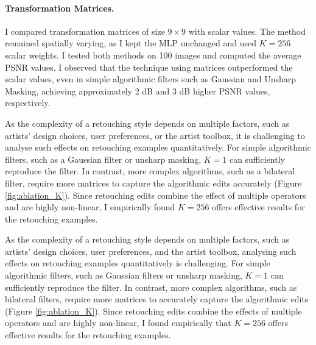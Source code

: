 \paragraph{Transformation Matrices.} I compared transformation matrices of size $9 \times 9$ with scalar values. The method remained spatially varying, as I kept the MLP unchanged and used $K=256$ scalar weights. I tested both methods on 100 images and computed the average PSNR values. I observed that the technique using matrices outperformed the scalar values, even in simple algorithmic filters such as Gaussian and Unsharp Masking, achieving approximately 2 dB and 3 dB higher PSNR values, respectively.

As the complexity of a retouching style depends on multiple factors, such as artists’ design choices, user preferences, or the artist toolbox, it is challenging to analyse such effects on retouching examples quantitatively. For simple algorithmic filters, such as a Gaussian filter or unsharp masking, $K=1$ can sufficiently reproduce the filter. In contrast, more complex algorithms, such as a bilateral filter, require more matrices to capture the algorithmic edits accurately (Figure \ref{fig:ablation_K}). Since retouching edits combine the effect of multiple operators and are highly non-linear, I empirically found $K=256$ offers effective results for the retouching examples. 

As the complexity of a retouching style depends on multiple factors, such as artists’ design choices, user preferences, and the artist toolbox, analysing such effects on retouching examples quantitatively is challenging. For simple algorithmic filters, such as Gaussian filters or unsharp masking, $K=1$ can sufficiently reproduce the filter. In contrast, more complex algorithms, such as bilateral filters, require more matrices to accurately capture the algorithmic edits (Figure \ref{fig:ablation_K}). Since retouching edits combine the effects of multiple operators and are highly non-linear, I found empirically that $K=256$ offers effective results for the retouching examples.


